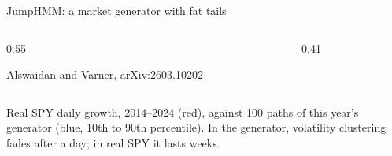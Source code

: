 \begin{frame}{JumpHMM: a market generator with fat tails}
  \begin{columns}[c,onlytextwidth]
    \begin{column}{0.55\textwidth}
      \vnjumphmmarchitecture\par
      \vspace{0.5em}
      {\footnotesize\color{vnslidebody} Alswaidan and Varner, arXiv:2603.10202\par}
    \end{column}
    \begin{column}{0.41\textwidth}
      \vnstylizedfacts{4.6cm}
    \end{column}
  \end{columns}
  \vfill
  {\scriptsize Real SPY daily growth, 2014–2024 (red), against 100 paths of this year's generator (blue, 10th to 90th
    percentile). In the generator, volatility clustering fades after a day; in real SPY it lasts weeks.\par}
\end{frame}
